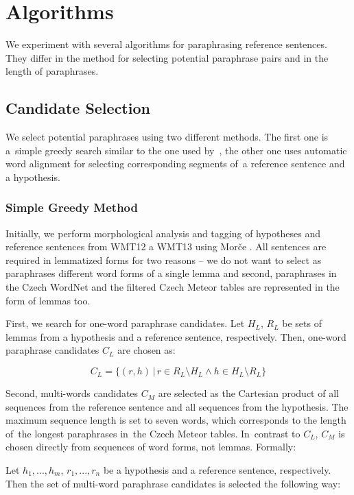 \section{Algorithms}
\label{algorithm}
We experiment with several algorithms for paraphrasing reference sentences. 
They differ in the method for selecting potential paraphrase pairs and in the 
length of paraphrases.

\subsection{Candidate Selection}
\label{candidates}
We select potential paraphrases using two different methods. The first one is 
a~simple greedy search similar to the one used by~\citet{kauchak}, the other 
one uses automatic word alignment for selecting corresponding segments 
of~a reference sentence and a hypothesis.

\subsubsection{Simple Greedy Method}
Initially, we perform morphological analysis and tagging of hypotheses and 
reference sentences from WMT12 a WMT13 using Morče \citep{morce:2007}. 
All sentences are required in lemmatized forms for two reasons -- we do not want 
to select as paraphrases different word forms of a single lemma and second, 
paraphrases in the Czech WordNet and the filtered Czech Meteor tables are 
represented in the form of lemmas too.

First, we search for one-word paraphrase candidates. 
Let $ H_{L} $, $ R_{L} $ be sets of lemmas from a hypothesis and a reference sentence, respectively. 
Then, one-word paraphrase candidates $C_{L} $ are chosen as:

\begin{equation*}
C_{L} = \{(r,h) \, | \, r \in R_{L} \setminus H_{L} \wedge h \in H_{L} \setminus R_{L} \} 
\end{equation*}

Second, multi-words candidates $ C_M $ are selected as the Cartesian product of all sequences from the reference sentence and all sequences from the hypothesis. 
The maximum sequence length is set to seven words, which corresponds to the length of~the longest paraphrases in~the Czech Meteor tables. 
In~contrast to $C_{L}$, $ C_M $ is chosen directly from sequences of word forms, not lemmas. Formally:

Let $ h_1,...,h_m $, $ r_1,..., r_n $  be a hypothesis and a reference sentence, respectively. 
Then the set of multi-word paraphrase candidates is selected the following way:

